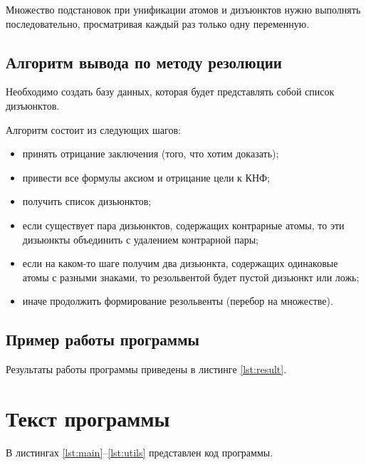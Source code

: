 \documentclass{bmstu}
\begin{document}
Множество подстановок при унификации атомов и дизъюнктов нужно выполнять последовательно, просматривая каждый раз только одну переменную.

\section{Алгоритм вывода по методу резолюции}

Необходимо создать базу данных, которая будет представлять собой список дизъюнктов. 

Алгоритм состоит из следующих шагов:
\begin{itemize}
    \item принять отрицание заключения (того, что хотим доказать);
    \item привести все формулы аксиом и отрицание цели к КНФ;
    \item получить список дизьюнктов;
    \item если существует пара дизьюнктов, содержащих контрарные атомы, то эти дизьюнкты объединить с удалением контрарной пары;
    \item если на каком-то шаге получим два дизьюнкта, содержащих одинаковые атомы с разными знаками, то резольвентой будет пустой дизьюнкт или ложь;
    \item иначе продолжить формирование резольвенты (перебор на множестве).
\end{itemize}

\section{Пример работы программы}

Результаты работы программы приведены в листинге \ref{lst:result}.


\chapter{Текст программы}

В листингах \ref{lst:main}--\ref{lst:utils} представлен код программы.




\end{document}
